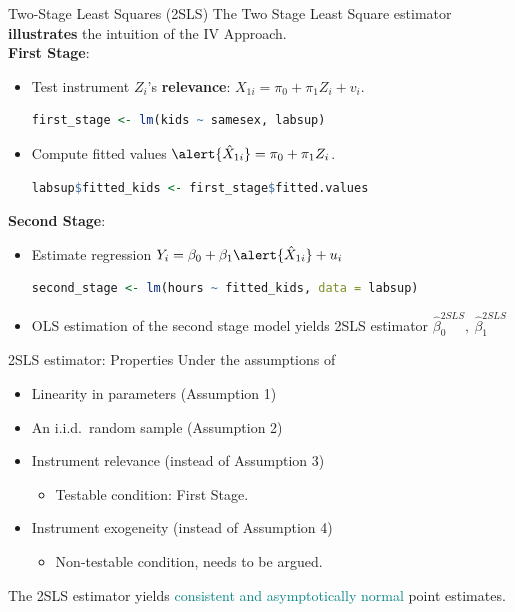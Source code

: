 \documentclass[9pt,aspectratio=169, xcolor=dvipsnames]{beamer}
\begin{document}
\begin{frame}[fragile]{Two-Stage Least Squares (2SLS)}
The Two Stage Least Square estimator \textbf{illustrates} the intuition of the IV Approach.
\\
\vspace{2mm}
\pause
\color{teal}\textbf{First Stage}: \color{black} 
\begin{itemize}
    \item Test instrument $Z_i$'s \textbf{relevance}: $X_{1i} = \pi_0 + \pi_1 Z_i + v_i$.
    \begin{lstlisting}[language=R]
    first_stage <- lm(kids ~ samesex, labsup)
    \end{lstlisting}
    \pause
    \item Compute fitted values $\alert{\hat{X}_{1i} }= \pi_0 + \pi_1 Z_i$.
    \begin{lstlisting}[language=R]
    labsup$fitted_kids <- first_stage$fitted.values
    \end{lstlisting}
\end{itemize}
\pause
\color{teal} \textbf{Second Stage}: \color{black} 
\begin{itemize}
    \item Estimate regression $Y_{i} = \beta_0 + \beta_1 \alert{\hat{X}_{1i}} + u_i$
    \begin{lstlisting}[language=R]
    second_stage <- lm(hours ~ fitted_kids, data = labsup)
    \end{lstlisting}
    \item[$\rightarrow$] OLS estimation of the second stage model yields 2SLS estimator $\hat{\beta}^{2SLS}_0, \: \hat{\beta}^{2SLS}_1$
\end{itemize}

\end{frame}


\begin{frame}{2SLS estimator: Properties}
Under the assumptions of 
\begin{itemize}
    \item Linearity in parameters (Assumption 1)
    \item An i.i.d.\ random sample (Assumption 2)
    \pause
    \item Instrument relevance (instead of Assumption 3)
    \begin{itemize}
        \item[$\rightarrow$] Testable condition: First Stage.
    \end{itemize}
    \item Instrument exogeneity (instead of Assumption 4)
    \begin{itemize}
        \item[$\rightarrow$] Non-testable condition, needs to be argued. 
    \end{itemize}
\end{itemize}
\begin{center}
The 2SLS estimator yields \textcolor{teal}{consistent and asymptotically normal} point estimates.    
\end{center}
\end{frame}
\end{document}

